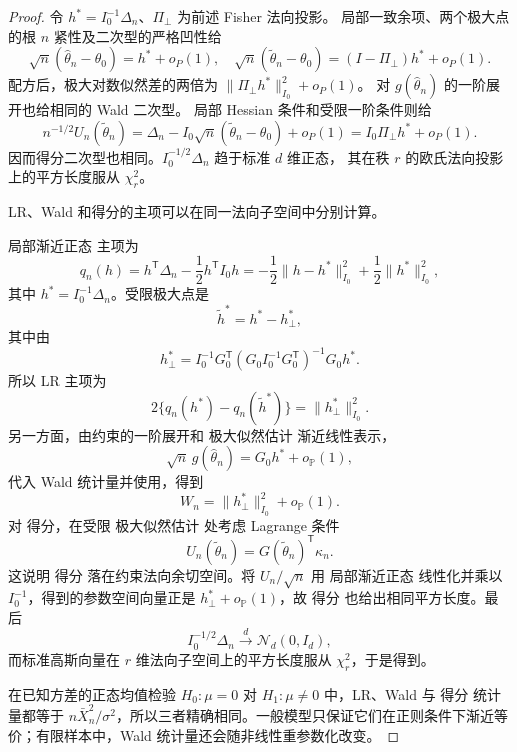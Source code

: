 \begin{proof}
令 $h^*=I_0^{-1}\Delta_n$、$\Pi_\perp$ 为前述 Fisher 法向投影。
局部一致余项、两个极大点的根 $n$ 紧性及二次型的严格凹性给
\[
 \sqrt n(\widehat\theta_n-\theta_0)=h^*+o_P(1),\quad
 \sqrt n(\widetilde\theta_n-\theta_0)=(I-\Pi_\perp)h^*+o_P(1).
\]
配方后，极大对数似然差的两倍为 $\|\Pi_\perp h^*\|_{I_0}^2+o_P(1)$。
对 $g(\widehat\theta_n)$ 的一阶展开也给相同的 Wald 二次型。
局部 Hessian 条件和受限一阶条件则给
\[
 n^{-1/2}U_n(\widetilde\theta_n)
 =\Delta_n-I_0\sqrt n(\widetilde\theta_n-\theta_0)+o_P(1)
 =I_0\Pi_\perp h^*+o_P(1).
\]
因而得分二次型也相同。$I_0^{-1/2}\Delta_n$ 趋于标准 $d$ 维正态，
其在秩 $r$ 的欧氏法向投影上的平方长度服从 $\chi^2_r$。

LR、Wald 和得分的主项可以在同一法向子空间中分别计算。

局部渐近正态 主项为
\[
 q_n(h)
 =h^{\mathsf T}\Delta_n-\frac12h^{\mathsf T}I_0h
 =-\frac12\|h-h^*\|_{I_0}^2
 +\frac12\|h^*\|_{I_0}^2,
\]
其中 $h^*=I_0^{-1}\Delta_n$。受限极大点是
\[
 \widetilde h^*=h^*-h_\perp^*,
\]
其中由
\[
 h_\perp^*
 =I_0^{-1}G_0^{\mathsf T}
 (G_0I_0^{-1}G_0^{\mathsf T})^{-1}
 G_0h^*.
\]
所以 LR 主项为
\[
 2\{q_n(h^*)-q_n(\widetilde h^*)\}
 =\|h_\perp^*\|_{I_0}^2.
\]
另一方面，由约束的一阶展开和 极大似然估计 渐近线性表示，
\[
 \sqrt n\,g(\widehat\theta_n)
 =G_0h^*+o_{\mathbb P}(1),
\]
代入 Wald 统计量并使用，得到
\[
 W_n
 =\|h_\perp^*\|_{I_0}^2+o_{\mathbb P}(1).
\]
对 得分，在受限 极大似然估计 处考虑 Lagrange 条件
\[
 U_n(\widetilde\theta_n)
 =G(\widetilde\theta_n)^{\mathsf T}\kappa_n.
\]
这说明 得分 落在约束法向余切空间。将 $U_n/\sqrt n$ 用 局部渐近正态 线性化并乘以 $I_0^{-1}$，得到的参数空间向量正是 $h_\perp^*+o_{\mathbb P}(1)$，故 得分 也给出相同平方长度。最后
\[
 I_0^{-1/2}\Delta_n\xrightarrow{d}\mathcal N_d(0,I_d),
\]
而标准高斯向量在 $r$ 维法向子空间上的平方长度服从 $\chi^2_r$，于是得到。

在已知方差的正态均值检验 $H_0:\mu=0$ 对 $H_1:\mu\neq0$ 中，LR、Wald 与 得分 统计量都等于 $n\bar X_n^2/\sigma^2$，所以三者精确相同。一般模型只保证它们在正则条件下渐近等价；有限样本中，Wald 统计量还会随非线性重参数化改变。
\end{proof}


